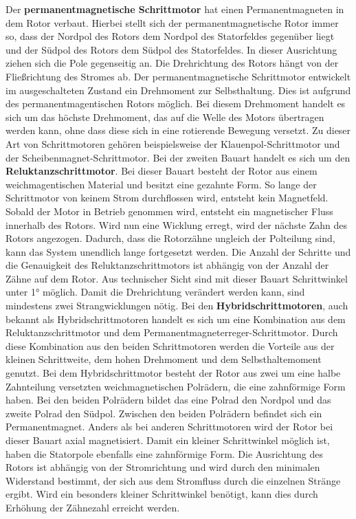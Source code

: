 Der \textbf{permanentmagnetische Schrittmotor} hat einen Permanentmagneten in dem Rotor verbaut. Hierbei stellt sich der permanentmagnetische Rotor immer so, dass der Nordpol des Rotors dem Nordpol des Statorfeldes gegenüber liegt und der Südpol des Rotors dem Südpol des Statorfeldes. In dieser Ausrichtung ziehen sich die Pole gegenseitig an. Die Drehrichtung des Rotors hängt von der Fließrichtung des Stromes ab. Der permanentmagnetische Schrittmotor entwickelt im ausgeschalteten Zustand ein Drehmoment zur Selbsthaltung. Dies ist aufgrund des permanentmagentischen Rotors möglich. Bei diesem Drehmoment handelt es sich um das höchste Drehmoment, das auf die Welle des Motors übertragen werden kann, ohne dass diese sich in eine rotierende Bewegung versetzt. Zu dieser Art von Schrittmotoren gehören beispielsweise der Klauenpol-Schrittmotor und der Scheibenmagnet-Schrittmotor. Bei der zweiten Bauart handelt es sich um den \textbf{Reluktanzschrittmotor}. Bei dieser Bauart besteht der Rotor aus einem weichmagentischen Material und besitzt eine gezahnte Form. So lange der Schrittmotor von keinem Strom durchflossen wird, entsteht kein Magnetfeld. Sobald der Motor in Betrieb genommen wird, entsteht ein magnetischer Fluss innerhalb des Rotors. Wird nun eine Wicklung erregt, wird der nächste Zahn des Rotors angezogen. Dadurch, dass die Rotorzähne ungleich der Polteilung sind, kann das System unendlich lange fortgesetzt werden. Die Anzahl der Schritte und die Genauigkeit des Reluktanzschrittmotors ist abhängig von der Anzahl der Zähne auf dem Rotor. Aus technischer Sicht sind mit dieser Bauart Schrittwinkel unter 1° möglich. Damit die Drehrichtung verändert werden kann, sind mindestens zwei Strangwicklungen nötig. Bei den \textbf{Hybridschrittmotoren}, auch bekannt als Hybridschrittmotoren handelt es sich um eine Kombination aus dem Reluktanzschrittmotor und dem Permanentmagneterreger-Schrittmotor. Durch diese Kombination aus den beiden Schrittmotoren werden die Vorteile aus der kleinen Schrittweite, dem hohen Drehmoment und dem Selbsthaltemoment genutzt. Bei dem Hybridschrittmotor besteht der Rotor aus zwei um eine halbe Zahnteilung versetzten weichmagnetischen Polrädern, die eine zahnförmige Form haben. Bei den beiden Polrädern bildet das eine Polrad den Nordpol und das zweite Polrad den Südpol. Zwischen den beiden Polrädern befindet sich ein Permanentmagnet. Anders als bei anderen Schrittmotoren wird der Rotor bei dieser Bauart axial magnetisiert. Damit ein kleiner Schrittwinkel möglich ist, haben die Statorpole ebenfalls eine zahnförmige Form. Die Ausrichtung des Rotors ist abhängig von der Stromrichtung und wird durch den minimalen Widerstand bestimmt, der sich aus dem Stromfluss durch die einzelnen Stränge ergibt. Wird ein besonders kleiner Schrittwinkel benötigt, kann dies durch Erhöhung der Zähnezahl erreicht werden. \cite{Schroeder:2021,Hagl:2021,Babiel:2023}

